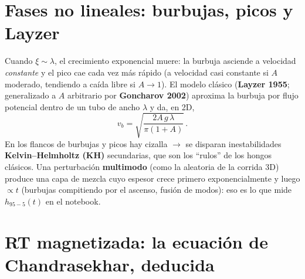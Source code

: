 \documentclass[11pt,a4paper]{article}
\newcommand{\term}[1]{\textbf{#1}}
\begin{document}
\section{Fases no lineales: burbujas, picos y Layzer}

Cuando $\xi\sim\lambda$, el crecimiento exponencial muere: la burbuja asciende a velocidad
\emph{constante} y el pico cae cada vez más rápido (a velocidad casi constante si $A$
moderado, tendiendo a caída libre si $A\to1$). El modelo clásico (\term{Layzer 1955};
generalizado a $A$ arbitrario por \term{Goncharov 2002}) aproxima la burbuja por flujo
potencial dentro de un tubo de ancho $\lambda$ y da, en 2D,
\begin{equation}
v_b=\sqrt{\frac{2A\,g\,\lambda}{\pi(1+A)}}\,.
\end{equation}
En los flancos de burbujas y picos hay cizalla $\rightarrow$ se disparan inestabilidades
\term{Kelvin--Helmholtz (KH)} secundarias, que son los ``rulos'' de los hongos clásicos.
Una perturbación \term{multimodo} (como la aleatoria de la corrida 3D) produce una capa de
mezcla cuyo espesor crece primero exponencialmente y luego $\propto t$ (burbujas compitiendo
por el ascenso, fusión de modos): eso es lo que mide $h_{95-5}(t)$ en el notebook.

\section{RT magnetizada: la ecuación de Chandrasekhar, deducida}
\label{sec:rtmhd}
\end{document}
